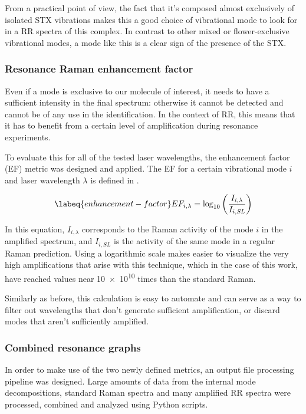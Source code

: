 From a practical point of view, the fact that it's composed almost exclusively of isolated STX vibrations makes this a good choice of vibrational mode to look for in a RR spectra of this complex.
In contrast to other mixed or flower-exclusive vibrational modes, a mode like this is a clear sign of the presence of the STX.

\subsubsection{Resonance Raman enhancement factor}
Even if a mode is exclusive to our molecule of interest, it needs to have a sufficient intensity in the final spectrum: otherwise it cannot be detected and cannot be of any use in the identification.
In the context of RR, this means that it has to benefit from a certain level of amplification during resonance experiments.

To evaluate this for all of the tested laser wavelengths, the enhancement factor (EF) metric was designed and applied.
The EF for a certain vibrational mode $i$ and laser wavelength $\lambda$ is defined in .

\begin{equation}
    \labeq{enhancement-factor}
    EF_{i,\lambda} = \log_{10}\left(\frac{I_{i,\lambda}}{I_{i,\textit{SL}}}\right)
\end{equation}

In this equation, $I_{i,\lambda}$ corresponds to the Raman activity of the mode $i$ in the amplified spectrum, and $I_{i,\textit{SL}}$ is the activity of the same mode in a regular Raman prediction.
Using a logarithmic scale makes easier to visualize the very high amplifications that arise with this technique, which in the case of this work, have reached values near \num{10e10} times than the standard Raman.

Similarly as before, this calculation is easy to automate and can serve as a way to filter out wavelengths that don't generate sufficient amplification, or discard modes that aren't sufficiently amplified.

\subsubsection{Combined resonance graphs}
In order to make use of the two newly defined metrics, an output file processing pipeline was designed.
Large amounts of data from the internal mode decompositions, standard Raman spectra and many amplified RR spectra were processed, combined and analyzed using Python scripts.

